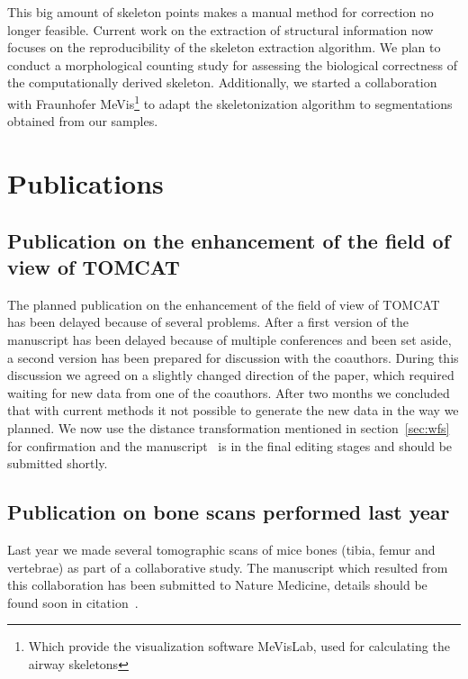 \documentclass[a4paper,twoside,DIV=calc]{scrartcl}
\begin{document}
This big amount of skeleton points makes a manual method for correction no longer feasible. Current work on the extraction of structural information now focuses on the reproducibility of the skeleton extraction algorithm. We plan to conduct a morphological counting study for assessing the biological correctness of the computationally derived skeleton. Additionally, we started a collaboration with Fraunhofer MeVis\footnote{Which provide the visualization software MeVisLab, used for calculating the airway skeletons} to adapt the skeletonization algorithm to segmentations obtained from our samples.

\section{Publications}\label{sec:publications}
\subsection{Publication on the enhancement of the field of view of TOMCAT}
The planned publication on the enhancement of the field of view of TOMCAT has been delayed because of several problems. After a first version of the manuscript has been delayed because of multiple conferences and been set aside, a second version has been prepared for discussion with the coauthors. During this discussion we agreed on a slightly changed direction of the paper, which required waiting for new data from one of the coauthors. After two months we concluded that with current methods it not possible to generate the new data in the way we planned. We now use the distance transformation mentioned in section~\ref{sec:wfs} for confirmation and the manuscript~\cite{Haberthuer2010} is in the final editing stages and should be submitted shortly.

\subsection{Publication on bone scans performed last year}
Last year we made several tomographic scans of mice bones (tibia, femur and vertebrae) as part of a collaborative study. The manuscript which resulted from this collaboration has been submitted to Nature Medicine, details should be found soon in citation~\cite{Sausbier2009b}.



\end{document}

